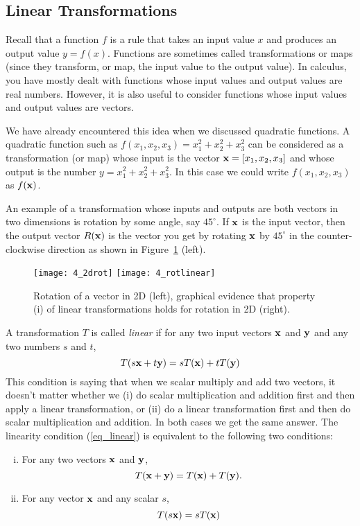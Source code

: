 \subsection{Linear Transformations}

Recall that a function $f$ is a rule that takes an input value $x$ and
produces an output value $y=f(x)$. Functions are sometimes called
transformations or maps (since they transform, or map, the input value
to the output value).  In calculus, you have mostly dealt with
functions whose input values and output values are real
numbers. However, it is also useful to consider functions whose input
values and output values are vectors.

We have already encountered this idea when we discussed quadratic
functions. A quadratic function such as
$f(x_1,x_2,x_3)=x_1^2+x_2^2+x_3^2$ can be considered as a
transformation (or map) whose input is the vector ${\bf x}=[x_1,x_2,x_3]$
and whose output is the number $y=x_1^2+x_2^2+x_3^2$.  In this case we
could write $f(x_1,x_2,x_3)$ as $f({\bf x})$.

An example of a transformation whose inputs and outputs are both
vectors in two dimensions is rotation by some angle, say
$45^\circ$. If ${\bf x}$ is the input vector, then the output vector
$R({\bf x})$ is the vector you get by rotating ${\bf x}$ by $45^\circ$ in the
counter-clockwise direction as shown in Figure~\ref{fig_2drot} (left). 

\begin{figure}
\centerline{\texttt{[image: 4\_2drot]}
\texttt{[image: 4\_rotlinear]}}
\caption{Rotation of a vector in 2D (left), graphical evidence that
property (i) of linear transformations holds for rotation in 2D
(right).
\label{fig_2drot}}
\end{figure}

A transformation $T$ is called {\it linear} if for any two 
input vectors ${\bf x}$ and ${\bf y}$ and any two numbers $s$ and $t$, 
\begin{equation}
\label{eq_linear}
T(s{\bf x} + t{\bf y}) = s T({\bf x}) + t T({\bf y})
\end{equation}
This condition is saying that when we scalar multiply and add two
vectors, it doesn't matter whether we (i) do scalar multiplication and
addition first and then apply a linear transformation, or (ii) do a
linear transformation first and then do scalar multiplication and
addition. In both cases we get the same answer.  The linearity
condition (\ref{eq_linear}) is equivalent to the following two conditions:
\begin{enumerate}[(i)]
\item For any two vectors ${\bf x}$ and ${\bf y}$,
\[
T({\bf x} + {\bf y}) = T({\bf x}) + T({\bf y}).
\]
\item For any vector ${\bf x}$ and any scalar $s$,
\[
T(s{\bf x}) = sT({\bf x})
\]
\end{enumerate}

